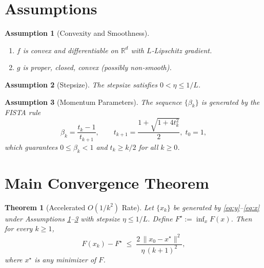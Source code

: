 \documentclass{article}
\newtheorem{theorem}{Theorem}
\newtheorem{assumption}{Assumption}
\newcommand{\R}{\mathbb{R}}
\begin{document}
\section*{Assumptions}
\begin{assumption}[Convexity and Smoothness]\label{ass:convex}
\begin{enumerate}[label=(\alph*)]
\item $f$ is convex and differentiable on $\R^{d}$ with $L$‑Lipschitz gradient.
\item $g$ is proper, closed, convex (possibly non‑smooth).
\end{enumerate}
\end{assumption}

\begin{assumption}[Stepsize]\label{ass:stepsize}
The stepsize satisfies $0<\eta\le 1/L$.
\end{assumption}

\begin{assumption}[Momentum Parameters]\label{ass:beta}
The sequence $\{\beta_k\}$ is generated by the FISTA rule
\[
\beta_k = \frac{t_k-1}{t_{k+1}},\qquad 
t_{k+1}= \frac{1+\sqrt{1+4t_k^{2}}}{2},\;t_0=1,
\]
which guarantees $0\le\beta_k<1$ and $t_k\ge k/2$ for all $k\ge0$.
\end{assumption}

\section*{Main Convergence Theorem}
\begin{theorem}[Accelerated $O(1/k^{2})$ Rate]\label{thm:rate}
Let $\{x_k\}$ be generated by \eqref{eq:y}–\eqref{eq:x} under Assumptions \ref{ass:convex}–\ref{ass:beta} with stepsize $\eta\le 1/L$.  
Define $F^\star:=\inf_{x}F(x)$. Then for every $k\ge 1$,
\[
F(x_k)-F^\star \;\le\; \frac{2\,\|x_0-x^\star\|^{2}}{\eta\, (k+1)^{2}},
\]
where $x^\star$ is any minimizer of $F$.
\end{theorem}
\end{document}
